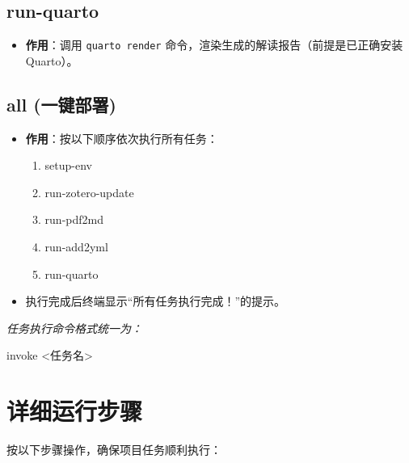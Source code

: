 \documentclass[
  letterpaper,
  DIV=11,
  numbers=noendperiod]{scrreprt}
\newenvironment{Shaded}{\begin{snugshade}}{\end{snugshade}}
\newcommand{\ExtensionTok}[1]{\textcolor[rgb]{0.00,0.23,0.31}{#1}}
\newcommand{\NormalTok}[1]{\textcolor[rgb]{0.00,0.23,0.31}{#1}}
\newcommand{\OperatorTok}[1]{\textcolor[rgb]{0.37,0.37,0.37}{#1}}
\providecommand{\tightlist}{%
  \setlength{\itemsep}{0pt}\setlength{\parskip}{0pt}}\usepackage{longtable,booktabs,array}
\begin{document}
\subsection{run-quarto}\label{run-quarto}

\begin{itemize}
\tightlist
\item
  \textbf{作用}：调用 \texttt{quarto\ render}
  命令，渲染生成的解读报告（前提是已正确安装 Quarto）。
\end{itemize}

\subsection{all (一键部署)}\label{all-ux4e00ux952eux90e8ux7f72}

\begin{itemize}
\tightlist
\item
  \textbf{作用}：按以下顺序依次执行所有任务：

  \begin{enumerate}
  \def\labelenumi{\arabic{enumi}.}
  \tightlist
  \item
    setup-env
  \item
    run-zotero-update\\
  \item
    run-pdf2md\\
  \item
    run-add2yml\\
  \item
    run-quarto\\
  \end{enumerate}
\item
  执行完成后终端显示``所有任务执行完成！''的提示。
\end{itemize}

\emph{任务执行命令格式统一为：}

\begin{Shaded}
\begin{Highlighting}[]
\ExtensionTok{invoke} \OperatorTok{\textless{}}\NormalTok{任务名}\OperatorTok{\textgreater{}}
\end{Highlighting}
\end{Shaded}

\section{详细运行步骤}\label{ux8be6ux7ec6ux8fd0ux884cux6b65ux9aa4}

按以下步骤操作，确保项目任务顺利执行：
\end{document}
